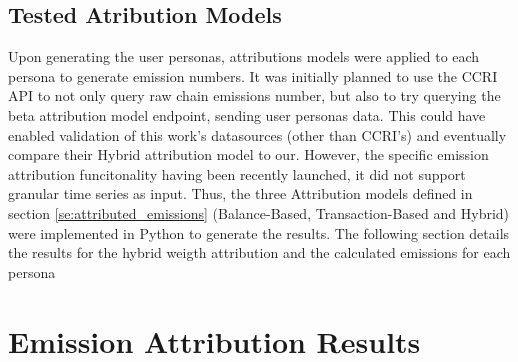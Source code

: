 \documentclass[11pt]{report}
\begin{document}
\subsection{Tested Atribution Models}

Upon generating the user personas, attributions models were applied to each persona to generate emission numbers. It was initially planned to use the \ac{CCRI} API to not only query raw chain emissions number, but also to try querying the beta attribution model endpoint, sending user personas data. This could have enabled validation of this work's datasources (other than CCRI's) and eventually compare their Hybrid attribution model to our. However, the specific emission attribution funcitonality having been recently launched, it did not support granular time series as input. Thus, the three Attribution models defined in section \ref{se:attributed_emissions} (Balance-Based, Transaction-Based and Hybrid) were implemented in Python to generate the results. The following section details the results for the hybrid weigth attribution and the calculated emissions for each persona





\section{Emission Attribution Results}
\end{document}
